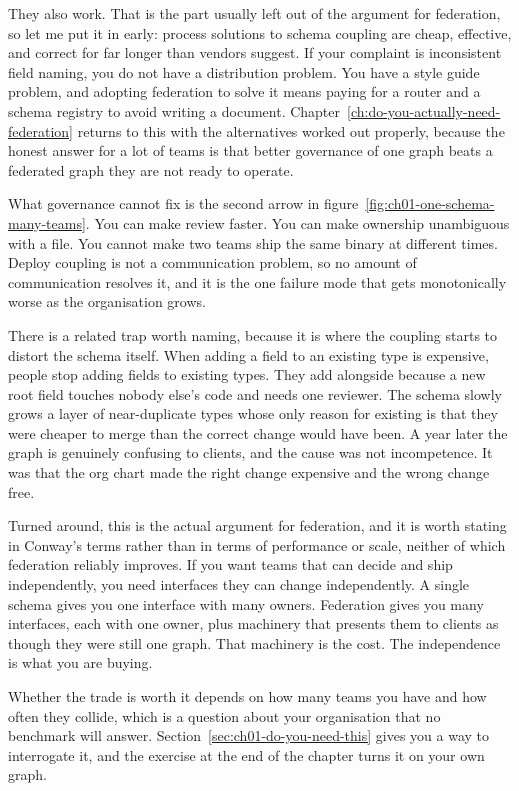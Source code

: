 They also work. That is the part usually left out of the argument for
federation, so let me put it in early: process solutions to schema coupling are
cheap, effective, and correct for far longer than vendors suggest. If your
complaint is inconsistent field naming, you do not have a distribution problem.
You have a style guide problem, and adopting federation to solve it means paying
for a router and a schema registry to avoid writing a document.
Chapter~\ref{ch:do-you-actually-need-federation} returns to this with the
alternatives worked out properly, because the honest
answer for a lot of teams is that better governance of one graph beats a
federated graph they are not ready to operate.

%
What governance cannot fix is the second arrow in
figure~\ref{fig:ch01-one-schema-many-teams}. You can make review faster. You
can make ownership unambiguous with a  file. You cannot make
two teams ship the same binary at different times. Deploy coupling is not a
communication problem, so no amount of communication resolves it, and it is the
one failure mode that gets monotonically worse as the organisation grows.

There is a related trap worth naming, because it is where the coupling starts to
distort the schema itself. When adding a field to an existing type is expensive,
people stop adding fields to existing types. They add
 alongside  because a new root field
touches nobody else's code and needs one reviewer. The schema slowly grows a
layer of near-duplicate types whose only reason for existing is that they were
cheaper to merge than the correct change would have been. A year later the graph
is genuinely confusing to clients, and the cause was not incompetence. It was
that the org chart made the right change expensive and the wrong change free.

%
Turned around, this is the actual argument for federation, and it is worth
stating in Conway's terms rather than in terms of performance or scale, neither
of which federation reliably improves. If you want teams that can decide and
ship independently, you need interfaces they can change independently. A single
schema gives you one interface with many owners. Federation gives you many
interfaces, each with one owner, plus machinery that presents them to clients as
though they were still one graph. That machinery is the cost. The independence
is what you are buying.

Whether the trade is worth it depends on how many teams you have and how often
they collide, which is a question about your organisation that no benchmark will
answer. Section~\ref{sec:ch01-do-you-need-this} gives you a way to interrogate
it, and the exercise at the end of the chapter turns it on your own graph.
